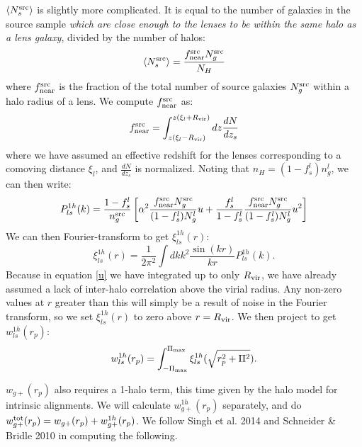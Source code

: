 \documentclass[onecolumn,amsmath,aps,fleqn, superscriptaddress]{revtex4}
\begin{document}
$\langle N_s^{\rm src} \rangle$ is slightly more complicated. It is equal to the number of galaxies in the source sample {\it which are close enough to the lenses to be within the same halo as a lens galaxy}, divided by the number of halos:
\begin{equation}
\langle N_s^{\rm src} \rangle = \frac{f_{\rm near}^{\rm src} N_g^{\rm src}}{N_H}
\label{Nsmean_sources}
\end{equation}
where $f_{\rm near}^{\rm src}$ is the fraction of the total number of source galaxies $N_g^{\rm src}$ within a halo radius of a lens. We compute $f_{\rm near}^{\rm src}$ as:
\begin{equation}
f_{\rm near}^{\rm src} = \int^{z(\xi_l+R_{\rm vir})}_{z(\xi_l-R_{\rm vir})}dz \frac{dN}{dz_s}
\label{frac_src_near}
\end{equation}
where we have assumed an effective redshift for the lenses corresponding to a comoving distance $\xi_l$, and $\frac{dN}{dz_s}$ is normalized. Noting that $n_H = (1-f_s^l) n_g^l$, we can then write:
\begin{equation}
P_{ls}^{1h}(k) = \frac{1-f_s^l}{n_g^{\rm src}}\left[\alpha^2 \frac{f_{\rm near}^{\rm src}N_g^{\rm src}}{(1-f_s^l)N_g^{l}} u + \frac{f_s^l}{1-f_s^l}\frac{f_{\rm near}^{\rm src}N_g^{\rm src}}{(1-f_s^l)N_g^{l}}u^2\right]
\label{1hpgg_fs}
\end{equation}
We can then Fourier-transform to get $\xi^{1h}_{ls}(r)$:
\begin{equation}
\xi_{ls}^{1h}(r) = \frac{1}{2\pi^2} \int dk k^2 \frac{\sin(kr)}{kr} P_{ls}^{1h}(k).
\label{xils1h}
\end{equation}
Because in equation \ref{u} we have integrated up to only $R_{\rm vir}$, we have already assumed a lack of inter-halo correlation above the virial radius. Any non-zero values at $r$ greater than this will simply be a result of noise in the Fourier transform, so we set $\xi_{ls}^{1h}(r)$ to zero above $r= R_{\rm vir}$. We then project to get $w_{ls}^{1h}(r_p)$:
\begin{equation}
w_{ls}^{1h}(r_p) = \int_{-\Pi_{\rm max}}^{\Pi_{\rm max}} \xi_{ls}^{1h}(\sqrt{r_p^2 + \Pi^2}).
\label{wl1h}
\end{equation}

$w_{g+}(r_p)$ also requires a 1-halo term, this time given by the halo model for intrinsic alignments. We will calculate $w_{g+}^{1h}(r_p)$ separately, and do $w_{g+}^{\rm tot}(r_p) = w_{g+}(r_p) + w_{g+}^{1h}(r_p)$. We follow Singh et al. 2014 and Schneider \& Bridle 2010 in computing the following.
\end{document}
